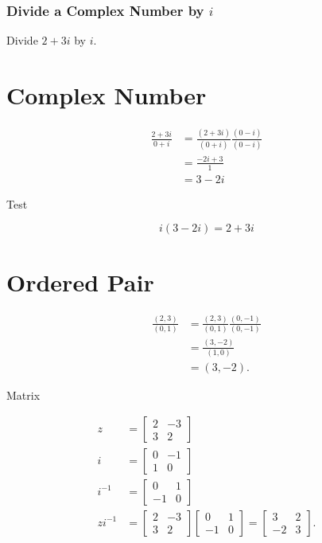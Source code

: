 \documentclass[10pt]{article}
\begin{document}
\subsubsection{Divide a Complex Number by $i$}
Divide $2+3 i$ by $i$.

\section{Complex Number}
$$
\begin{aligned}
\frac{2+3 i}{0+i} & =\frac{(2+3 i)}{(0+i)} \frac{(0-i)}{(0-i)} \\
& =\frac{-2 i+3}{1} \\
& =3-2 i
\end{aligned}
$$

Test

$$
i(3-2 i)=2+3 i
$$

\section{Ordered Pair}
$$
\begin{aligned}
\frac{(2,3)}{(0,1)} & =\frac{(2,3)}{(0,1)} \frac{(0,-1)}{(0,-1)} \\
& =\frac{(3,-2)}{(1,0)} \\
& =(3,-2) .
\end{aligned}
$$

Matrix

$$
\begin{aligned}
z & =\left[\begin{array}{cc}
2 & -3 \\
3 & 2
\end{array}\right] \\
i & =\left[\begin{array}{cc}
0 & -1 \\
1 & 0
\end{array}\right] \\
i^{-1} & =\left[\begin{array}{cc}
0 & 1 \\
-1 & 0
\end{array}\right] \\
z i^{-1} & =\left[\begin{array}{ll}
2 & -3 \\
3 & 2
\end{array}\right]\left[\begin{array}{cc}
0 & 1 \\
-1 & 0
\end{array}\right]=\left[\begin{array}{cc}
3 & 2 \\
-2 & 3
\end{array}\right] .
\end{aligned}
$$
\end{document}
